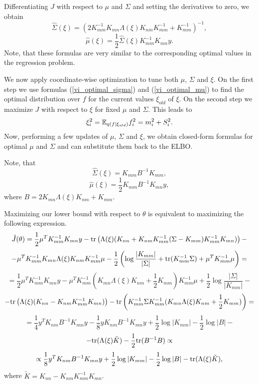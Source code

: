 Differentiating $J$ with respect to $\mu$ and $\Sigma$ and setting the derivatives to zero, we obtain
\begin{equation}\label{vi_optimal_sigma}
	\hat \Sigma(\xi) = (2 K_{mm}^{-1} K_{mn} \Lambda(\xi) K_{nm} K_{mm}^{-1} + K_{mm}^{-1})^{-1},
\end{equation}
\begin{equation}\label{vi_optimal_mu}
	\hat \mu(\xi) = \frac 1 2 \hat \Sigma(\xi) K_{mm}^{-1} K_{mn} y.
\end{equation}
Note, that these formulas are very similar to the corresponding optimal values in the regression problem.

We now apply coordinate-wise optimization to tune both $\mu$, $\Sigma$ and $\xi$. On the first step we use formulas (\ref{vi_optimal_sigma}) and (\ref{vi_optimal_mu}) to find the optimal distribution over $f$ for the current values $\xi_{old}$ of $\xi$. On the second step we maximize $J$ with respect to $\xi$ for fixed $\mu$ and $\Sigma$. This leads to
$$\xi_i^2 = \mathbb{E}_{q(f | \xi_{old})} f_i^2 = m_i^2 + S_i^2.$$
Now, performing a few updates of $\mu$, $\Sigma$ and $\xi$, we obtain closed-form formulas for optimal
$\mu$ and $\Sigma$ and can substitute them back to the ELBO.

Note, that
$$\hat\Sigma(\xi) = K_{mm} B^{-1} K_{mm},$$
$$\hat\mu(\xi) = \frac 1 2 K_{mm} B^{-1} K_{mn} y,$$
where $B = 2 K_{mn} \Lambda(\xi) K_{nm} + K_{mm}$.

Maximizing our lower bound with respect to $\theta$ is equivalent to maximizing the following expression.
$$ \hat J(\theta) =  \frac 1 2 \mu^T K_{mm}^{-1} K_{mn} y - \mbox{tr}\left(\Lambda(\xi) (K_{nn} + K_{nm} K_{mm}^{-1} (\Sigma - K_{mm}) K_{mm}^{-1} K_{mn})\right) -$$
$$ - \mu^T K_{mm}^{-1} K_{mn} \Lambda(\xi) K_{nm} K_{mm}^{-1} \mu -\frac 1 2 \left (\log \frac {|K_{mm}|} {|\Sigma|} + \mbox{tr}(K_{mm}^{-1} \Sigma) + \mu^T K_{mm}^{-1} \mu \right) = $$
$$ = \frac 1 2 \mu^T K_{mm}^{-1} K_{mn} y - \mu^T K_{mm}^{-1}\left(K_{mn} \Lambda(\xi) K_{nm} + \frac 1 2 K_{mm} \right)K_{mm}^{-1}\mu + \frac 1 2 \log \frac {|\Sigma|}{|K_{mm}|} - $$
$$ - \mbox{tr}\left(\Lambda(\xi) (K_{nn} - K_{nm} K_{mm}^{-1} K_{mn})\right) - \mbox{tr}\left(K_{mm}^{-1} \Sigma K_{mm}^{-1} (K_{mn} \Lambda(\xi) K_{nm} + \frac 1 2 K_{mm})\right) = $$
$$ = \frac 1 4 y^T K_{nm} B^{-1} K_{mn} y - \frac 1 8 y K_{nm} B^{-1} K_{mn} y + \frac 1 2 \log |K_{mm}| - \frac 1 2 \log |B| - $$
$$ - \mbox{tr}(\Lambda(\xi) \tilde K) - \frac 1 2 \mbox{tr}(B^{-1} B) \propto $$
$$\propto \frac 1 8 y^T K_{nm} B^{-1} K_{mn} y + \frac 1 2 \log |K_{mm}| - \frac 1 2 \log |B| - \mbox{tr}(\Lambda(\xi) \tilde K),$$
where $\tilde K = K_{nn} - K_{nm} K_{mm}^{-1} K_{mn}$.

